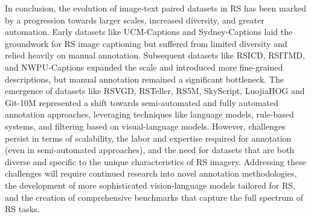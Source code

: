 In conclusion, the evolution of image-text paired datasets in RS has been marked by a progression towards larger scales, increased diversity, and greater automation. Early datasets like UCM-Captions and Sydney-Captions laid the groundwork for RS image captioning but suffered from limited diversity and relied heavily on manual annotation. Subsequent datasets like RSICD, RSITMD, and NWPU-Captions expanded the scale and introduced more fine-grained descriptions, but manual annotation remained a significant bottleneck. The emergence of datasets like RSVGD, RSTeller, RS5M, SkyScript, LuojiaHOG and Git-10M represented a shift towards semi-automated and fully automated annotation approaches, leveraging techniques like language models, rule-based systems, and filtering based on visual-language models. However, challenges persist in terms of scalability, the labor and expertise required for annotation (even in semi-automated approaches), and the need for datasets that are both diverse and specific to the unique characteristics of RS imagery. Addressing these challenges will require continued research into novel annotation methodologies, the development of more sophisticated vision-language models tailored for RS, and the creation of comprehensive benchmarks that capture the full spectrum of RS tasks.


